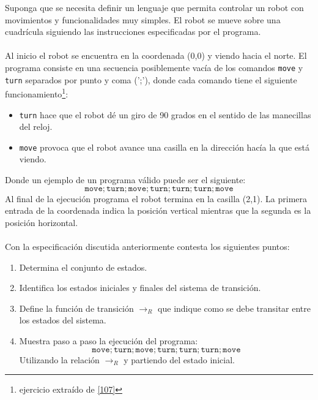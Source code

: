     \begin{exercise}
        Suponga que se necesita definir un lenguaje que permita controlar un robot con movimientos
        y funcionalidades muy simples. El robot se mueve sobre una cuadrícula siguiendo las instrucciones especificadas por el programa. \\\\
        Al inicio el robot se encuentra en la coordenada (0,0) y viendo hacia el norte. El programa consiste en una secuencia posiblemente 
        vacía de los comandos \texttt{move} y \texttt{turn} separados por punto y coma (';'), donde cada comando tiene el siguiente funcionamiento\footnote{ejercicio extraído de \hyperlink{107}{[107]}}:\\
    
        \begin{itemize}
            \item \texttt{turn} hace que el robot dé un giro de 90 grados en el sentido de las manecillas del reloj.
            \item \texttt{move} provoca que el robot avance una casilla en la dirección hacía la que está viendo.\\
        \end{itemize}

        Donde un ejemplo de un programa válido puede ser el siguiente:
        \[   \texttt{move};\texttt{turn};\texttt{move};\texttt{turn};\texttt{turn};\texttt{turn};\texttt{move} \]
        Al final de la ejecución programa el robot termina en la casilla (2,1). La primera entrada de la coordenada
        indica la posición vertical mientras que la segunda es la posición horizontal.\\\\

        Con la especificación discutida anteriormente contesta los siguientes puntos:\\

        \begin{enumerate}
            \item Determina el conjunto de estados. 
            \item Identifica los estados iniciales y finales del sistema de transición.
            \item Define la función de transición $\rightarrow_R$ que indique como se debe transitar entre los estados del sistema.
            \item Muestra paso a paso la ejecución del programa:
                  \[  \texttt{move};\texttt{turn};\texttt{move};\texttt{turn};\texttt{turn};\texttt{turn};\texttt{move} \]
                  Utilizando la relación $\rightarrow_R$ y partiendo del estado inicial.
         \end{enumerate}

    \end{exercise}


